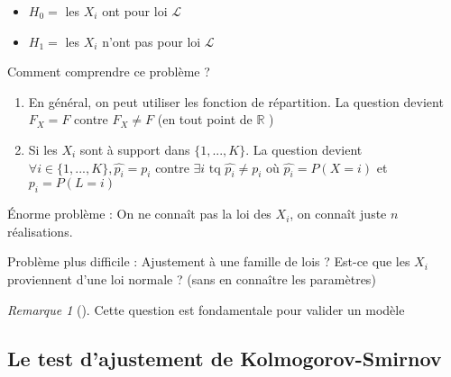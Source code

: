 \documentclass{article}
\theoremstyle{plain}%
\theoremstyle{definition}
\theoremstyle{remark}
\newtheorem*{rem}{Remarque}
\begin{document}
\begin{itemize}
    \item $ H_0 = $ les $ X_i $ ont pour loi $ \mathcal{L} $ 
    \item $ H_1 = $ les $ X_i $ n'ont pas pour loi $ \mathcal{L} $ 
\end{itemize}
Comment comprendre ce problème ? 
\begin{enumerate}
    \item En général, on peut utiliser les fonction de répartition. La question devient $ F_X = F $ contre $ F_X \neq F $ (en tout point de $ \mathbb{R} $ )
    \item Si les $ X_i $ sont à support dans $ \{1,..., K\} $. La question devient $ \forall i \in \{1,..., K\}, \hat{p_i} = p_i $ contre $ \exists i \text{ tq } \hat{p_i} \neq p_i $ où $ \hat{p_i} = P(X=i) $ et $ p_i = P(L=i) $ 
\end{enumerate}
Énorme problème : On ne connaît pas la loi des $ X_i $, on connaît juste $ n $ réalisations. 

Problème plus difficile : Ajustement à une famille de lois ? Est-ce que les $ X_i $ proviennent d'une loi normale ? (sans en connaître les paramètres)
\begin{rem}[]
    Cette question est fondamentale pour valider un modèle
\end{rem}

\subsection{Le test d'ajustement de Kolmogorov-Smirnov}
\end{document}
